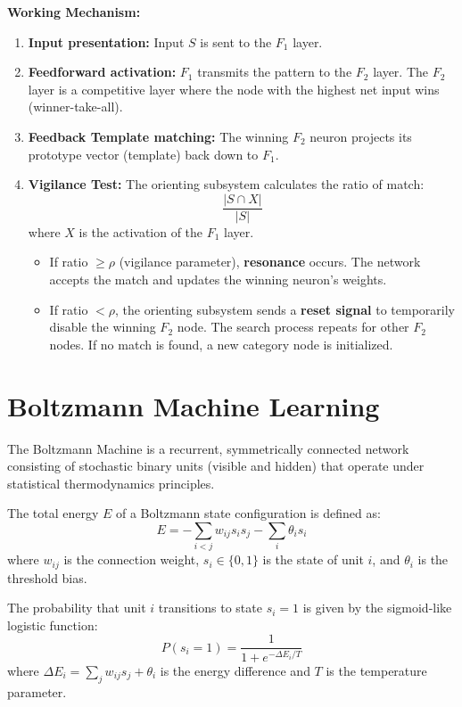 \documentclass[12pt,a4paper]{article}
\begin{document}
\par\noindent
\textbf{Working Mechanism:}
\begin{enumerate}[leftmargin=*, itemsep=2.5pt]
  \item \textbf{Input presentation:} Input $S$ is sent to the $F_1$ layer.
  \item \textbf{Feedforward activation:} $F_1$ transmits the pattern to the $F_2$ layer. The $F_2$ layer is a competitive layer where the node with the highest net input wins (winner-take-all).
  \item \textbf{Feedback Template matching:} The winning $F_2$ neuron projects its prototype vector (template) back down to $F_1$.
  \item \textbf{Vigilance Test:} The orienting subsystem calculates the ratio of match:
    \begin{equation}
      \frac{|S \cap X|}{|S|}
    \end{equation}
    where $X$ is the activation of the $F_1$ layer.
    \begin{itemize}[leftmargin=1.5em, itemsep=1.5pt]
      \item If ratio $\ge \rho$ (vigilance parameter), \textbf{resonance} occurs. The network accepts the match and updates the winning neuron's weights.
      \item If ratio $< \rho$, the orienting subsystem sends a \textbf{reset signal} to temporarily disable the winning $F_2$ node. The search process repeats for other $F_2$ nodes. If no match is found, a new category node is initialized.
    \end{itemize}
\end{enumerate}

\section{Boltzmann Machine Learning}

The Boltzmann Machine is a recurrent, symmetrically connected network consisting of stochastic binary units (visible and hidden) that operate under statistical thermodynamics principles.

\begin{tcolorbox}[formulabox, title={Boltzmann Energy \& Transition Rules}]
The total energy $E$ of a Boltzmann state configuration is defined as:
\begin{equation}
  E = -\sum_{i < j} w_{ij} s_i s_j - \sum_{i} \theta_i s_i
\end{equation}
where $w_{ij}$ is the connection weight, $s_i \in \{0, 1\}$ is the state of unit $i$, and $\theta_i$ is the threshold bias.
\par\noindent
The probability that unit $i$ transitions to state $s_i = 1$ is given by the sigmoid-like logistic function:
\begin{equation}
  P(s_i = 1) = \frac{1}{1 + e^{-\Delta E_i / T}}
\end{equation}
where $\Delta E_i = \sum_j w_{ij} s_j + \theta_i$ is the energy difference and $T$ is the temperature parameter.
\end{tcolorbox}
\end{document}
